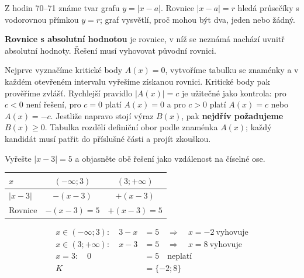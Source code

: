 \documentclass[11pt,a4paper]{article}
\begin{document}
Z hodin 70--71 známe tvar grafu $y=|x-a|$. Rovnice $|x-a|=r$ hledá průsečíky s vodorovnou přímkou $y=r$; graf vysvětlí, proč mohou být dva, jeden nebo žádný.
\begin{definiceBox}[title={Definice - Rovnice s absolutní hodnotou}]
\textbf{Rovnice s absolutní hodnotou} je rovnice, v níž se neznámá nachází uvnitř absolutní hodnoty. Řešení musí vyhovovat původní rovnici.
\end{definiceBox}
Nejprve vyznačíme kritické body $A(x)=0$, vytvoříme tabulku se znaménky a v každém otevřeném intervalu vyřešíme získanou rovnici. Kritické body pak prověříme zvlášť. Rychlejší pravidlo $|A(x)|=c$ je užitečné jako kontrola: pro $c<0$ není řešení, pro $c=0$ platí $A(x)=0$ a pro $c>0$ platí $A(x)=c$ nebo $A(x)=-c$.
Jestliže napravo stojí výraz $B(x)$, pak \textbf{nejdřív požadujeme $B(x)\ge0$}. Tabulka rozdělí definiční obor podle znaménka $A(x)$; každý kandidát musí patřit do příslušné části a projít zkouškou.
\begin{prikladReseniBox}[title={Příklad 1}]
Vyřešte $|x-3|=5$ a objasněte obě řešení jako vzdálenost na číselné ose.
\tcblower
\begin{center}
\begingroup\footnotesize
\renewcommand{\arraystretch}{1.32}
\begin{tabular}{@{}lcc@{}}
\toprule
$x$ & $(-\infty;3)$ & $(3;+\infty)$ \\
\midrule
$|x - 3|$ & $-(x - 3)$ & $+(x - 3)$ \\
\midrule
Rovnice & $-(x - 3)=5$ & $+(x - 3)=5$ \\
\bottomrule
\end{tabular}
\endgroup
\end{center}
\[\begin{aligned}x\in (-\infty;3):\quad 3 - x &= 5\quad\Longrightarrow\quad x=-2\ \text{vyhovuje}\\[2pt]
x\in (3;+\infty):\quad x - 3 &= 5\quad\Longrightarrow\quad x=8\ \text{vyhovuje}\\[2pt]
x=3:\quad 0 &= 5\quad\text{neplatí}\\[2pt]
K&=\{-2;8\}\end{aligned}\]
\end{prikladReseniBox}
\end{document}
